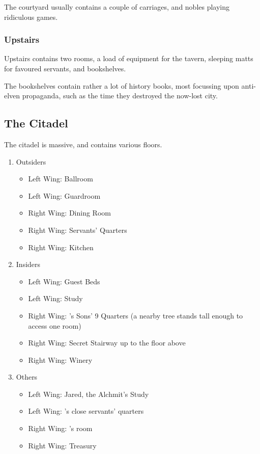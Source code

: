 The courtyard usually contains a couple of carriages, and nobles playing ridiculous games.

\subsubsection{Upstairs}

Upstairs contains two rooms, a load of equipment for the tavern, sleeping matts for favoured servants, and bookshelves.

The bookshelves contain rather a lot of history books, most focussing upon anti-elven propaganda, such as the time they destroyed the now-lost city.
 

\subsection{The Citadel}
The citadel is massive, and contains various floors.

\begin{enumerate}

	\item{Outsiders}
		\begin{itemize}
			\item{Left Wing: Ballroom}
			\item{Left Wing: Guardroom}
			\item{Right Wing: Dining Room}
			\item{Right Wing: Servants' Quarters}
			\item{Right Wing: Kitchen}
		\end{itemize}
	\item{Insiders}
		\begin{itemize}
			\item{Left Wing: Guest Beds}
			\item{Left Wing: Study}
			\item{Right Wing: 's Sons' 9 Quarters (a nearby tree stands tall enough to access one room)}
			\item{Right Wing: Secret Stairway up to the floor above}
			\item{Right Wing: Winery}
		\end{itemize}

	\item{Others}
		\begin{itemize}
			\item{Left Wing: Jared, the Alchmit's Study}
			\item{Left Wing: 's close servants' quarters}
			\item{Right Wing: 's room}
			\item{Right Wing: Treasury}
		\end{itemize}

\end{enumerate}

